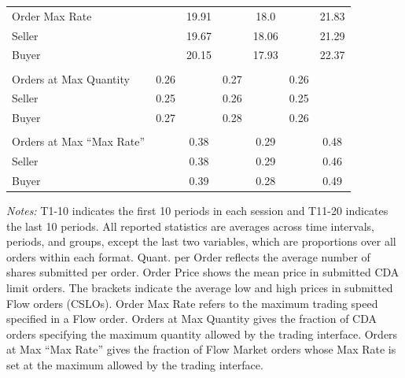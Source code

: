 \documentclass[12pt]{article}
\begin{document}
\begin{table}
{\begin{threeparttable}
\begin{tabular}{lcccccc}
    \\
     Order Max Rate                 &           & 19.91         &           & 18.0          &           & 21.83         \\
     \hspace{3mm}Seller             &           & 19.67         &           & 18.06         &           & 21.29         \\
     \hspace{3mm}Buyer              &           & 20.15         &           & 17.93         &           & 22.37         \\
    \\
    Orders at Max Quantity                     & 0.26      &               & 0.27      &               & 0.26      &               \\
    \hspace{3mm}Seller                         & 0.25      &               & 0.26      &               & 0.25      &               \\
    \hspace{3mm}Buyer                          & 0.27      &               & 0.28      &               & 0.26      &               \\
    \\
    Orders at Max ``Max Rate''                     &           & 0.38          &           & 0.29          &           & 0.48          \\
    \hspace{3mm}Seller                         &           & 0.38          &           & 0.29          &           & 0.46          \\
    \hspace{3mm}Buyer                          &           & 0.39          &           & 0.28          &           & 0.49          \\

    \bottomrule
    \end{tabular}
    \begin{tablenotes}
\item \small \textit{Notes:} 
T1-10 indicates the first 10 periods in each session and T11-20 indicates the last 10 periods.
    All reported statistics are averages across time intervals, periods, and groups, except the last two variables, which are proportions over all orders within each format. 
    Quant. per Order reflects the average number of shares submitted per order.
Order Price shows the mean price in submitted CDA limit orders. The brackets indicate the average low and high prices in submitted Flow orders (CSLOs).
Order Max Rate refers to the maximum trading speed specified in a Flow order. 
Orders at Max Quantity gives the fraction of CDA orders specifying the maximum quantity allowed by the trading interface. 
Orders at Max “Max Rate” gives the fraction of Flow Market orders whose Max Rate is set at the maximum allowed by the trading interface.
\end{tablenotes}
\end{threeparttable}
}
\label{tab:summary_stat_trader}
\end{table}
\end{document}

